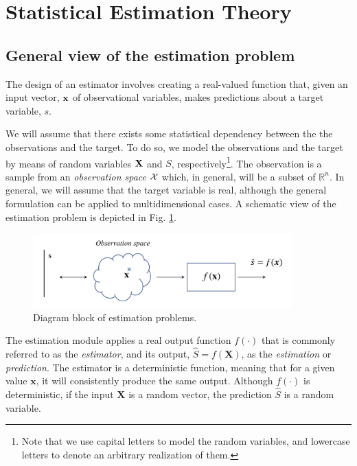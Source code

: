 \section{Statistical Estimation Theory}
\label{sec:SDT}



\subsection{General view of the estimation problem}
\label{subsec:hypotheses_problems}

The design of an estimator involves creating a real-valued function that, given an input vector, ${\bf x}$ of observational variables, makes predictions about a target variable, $s$.

We will assume that there exists some statistical dependency between the the observations and the target. To do so, we model the observations and the target by means of random variables ${\bf X}$ and $S$, respectively\footnote{Note that we use capital letters to model the random variables, and lowercase letters to denote an arbitrary realization of them.}. The observation is a sample from an \textit{observation space} ${\cal X}$ which, in general, will be a subset of $\mathbb{R}^n$. In general, we will assume that the target variable is real, although the general formulation can be applied to multidimensional cases. A schematic view of the estimation problem is depicted in Fig. \ref{fig:est_overview}.
\begin{figure}
\begin{center}
\includegraphics[width=10cm]{Figures//estimation_overview.png}
\end{center}
\caption{Diagram block of estimation problems.\label{fig:est_overview}}
\end{figure}

The estimation module applies a real output function $f(\cdot)$ that is commonly referred to as the \textit{estimator}, and its output, $\hat{S} = f(\mathbf{X})$, as the \textit{estimation} or \textit{prediction}. The estimator is a deterministic function, meaning that for a given value $\mathbf{x}$, it will consistently produce the same output. Although $f(\cdot)$ is deterministic, if the input $\mathbf{X}$ is a random vector, the prediction $\hat{S}$ is a random variable.

